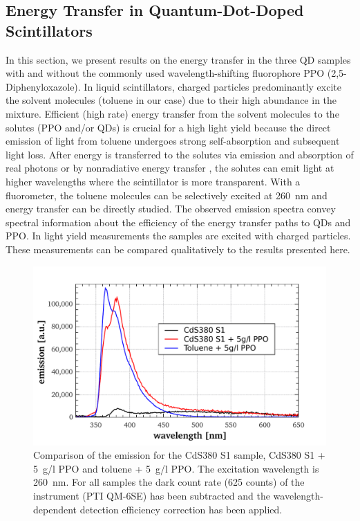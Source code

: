 \documentclass[cits]{JINST}
\begin{document}
\subsection{Energy Transfer in Quantum-Dot-Doped Scintillators}
In this section, we present results on the energy transfer in the three QD samples with and without the commonly used wavelength-shifting fluorophore PPO (2,5-Diphenyloxazole). In liquid scintillators, charged particles predominantly excite the solvent molecules (toluene in our case) due to their high abundance in the mixture. Efficient (high rate) energy transfer from the solvent molecules to the solutes (PPO and/or QDs) is crucial for a high light yield because the direct emission of light from toluene undergoes strong self-absorption and subsequent light loss. After energy is transferred to the solutes via emission and absorption of real photons or by nonradiative energy transfer \cite{foerster}, the solutes can emit light at higher wavelengths where the scintillator is more transparent. With a fluorometer, the toluene molecules can be selectively excited at 260~nm and energy transfer can be directly studied. The observed emission spectra convey spectral information about the efficiency of the energy transfer paths to QDs and PPO. In light yield measurements \cite{mitpaper} the samples are excited with charged particles. These measurements can be compared qualitatively to the results presented here.

\begin{figure}
      \begin{center}
        \includegraphics[scale=0.44]{graphs/G_QD380_ex260_corr.pdf}
        \caption[]{Comparison of the emission for the CdS380 S1 sample, CdS380 S1 + 5~g/l PPO and toluene + 5~g/l PPO. The excitation wavelength is 260~nm. For all samples the dark count rate (625 counts) of the instrument (PTI QM-6SE) has been subtracted and the wavelength-dependent detection efficiency correction has been applied. \label{G_QD380_ex260_corr}}
        \end{center}
\end{figure}
\end{document}
